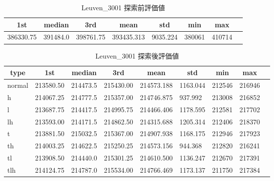 \begin{table}[htbp]
    \caption{Leuven\_3001 探索前評価値}
    \begin{tabular}{|l|l|l|l|l|l|l|l|}\hline
    \multicolumn{1}{|c|}{\textbf{1st}}
    &\multicolumn{1}{c|}{\textbf{median}}
    &\multicolumn{1}{c|}{\textbf{3rd}}
    &\multicolumn{1}{c|}{\textbf{mean}}
    &\multicolumn{1}{c|}{\textbf{std}}
    &\multicolumn{1}{c|}{\textbf{min}}
    &\multicolumn{1}{c|}{\textbf{max}}\\\hline
	386330.75 & 391484.0 & 398761.75 & 393435.313 & 9035.224 & 380061 & 410714\\\hline
	\end{tabular}
\end{table}
\begin{table}[htbp]
    \caption{Leuven\_3001 探索後評価値}
    \begin{tabular}{|l|l|l|l|l|l|l|l|l|}\hline
    \multicolumn{1}{|c|}{\textbf{type}}
    &\multicolumn{1}{|c|}{\textbf{1st}}
    &\multicolumn{1}{c|}{\textbf{median}}
    &\multicolumn{1}{c|}{\textbf{3rd}}
    &\multicolumn{1}{c|}{\textbf{mean}}
    &\multicolumn{1}{c|}{\textbf{std}}
    &\multicolumn{1}{c|}{\textbf{min}}
    &\multicolumn{1}{c|}{\textbf{max}}\\\hline
	normal & 213580.50 & 214473.5 & 215430.00 & 214573.188 & 1163.044 & 212546 & 216946\\\hline
	h & 214067.25 & 214777.5 & 215357.00 & 214746.875 & 937.992 & 213008 & 216852\\\hline
	l & 213687.75 & 214417.5 & 214995.75 & 214466.406 & 1178.595 & 212581 & 217702\\\hline
	lh & 213593.00 & 214171.5 & 214862.50 & 214315.688 & 1205.314 & 212406 & 218370\\\hline
	t & 213881.50 & 215032.5 & 215367.00 & 214907.938 & 1168.175 & 212946 & 217923\\\hline
	th & 214003.25 & 214622.5 & 215250.25 & 214573.156 & 944.368 & 212820 & 216241\\\hline
	tl & 213908.50 & 214440.0 & 215301.25 & 214610.500 & 1136.247 & 212670 & 217391\\\hline
	tlh & 214124.75 & 214787.0 & 215534.00 & 214766.469 & 1173.137 & 211750 & 217384\\\hline
	\end{tabular}
\end{table}
